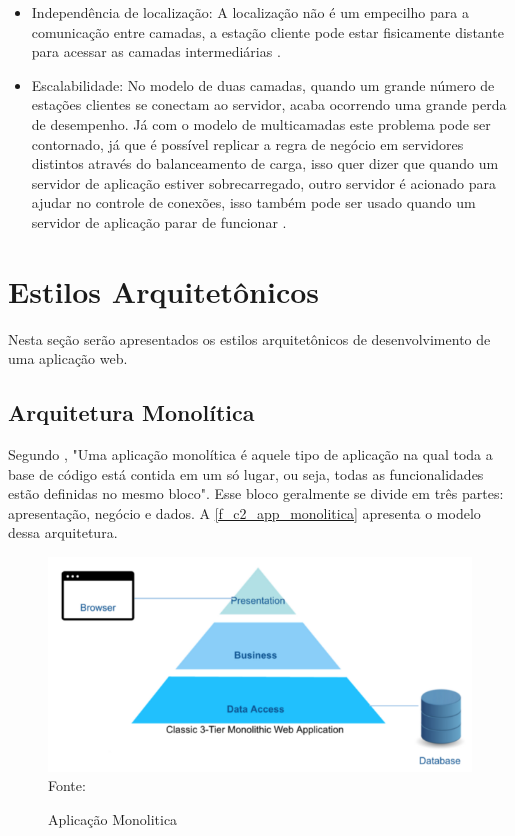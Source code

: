 \begin{itemize}
\item Independência de localização: A localização não é um empecilho para a comunicação entre camadas, a estação cliente pode estar fisicamente distante para acessar as camadas intermediárias  \cite{devmediaMultiCamada2018}.

\item Escalabilidade: No modelo de duas camadas, quando um grande número de estações clientes se conectam ao servidor, acaba ocorrendo uma grande perda de desempenho. Já com o modelo de multicamadas este problema pode ser contornado, já que é possível replicar a regra de negócio em servidores distintos através do balanceamento de carga, isso quer dizer que quando um servidor de aplicação estiver sobrecarregado, outro servidor é acionado para ajudar no controle de conexões, isso também pode ser usado quando um servidor de aplicação parar de funcionar \cite{devmediaMultiCamada2018}.
\end{itemize}

\section{Estilos Arquitetônicos}

Nesta seção serão apresentados os estilos arquitetônicos de desenvolvimento de uma aplicação web.

\subsection{Arquitetura Monolítica}

Segundo \cite{monoVsMicro2017},  "Uma aplicação monolítica é aquele tipo de aplicação na qual toda a base de código está contida em um só lugar, ou seja, todas as funcionalidades estão definidas no mesmo bloco". Esse bloco geralmente se divide em três partes: apresentação, negócio e dados. A \autoref{f_c2_app_monolitica} apresenta o modelo dessa arquitetura.

\begin{figure}[h]
	\centering
	\caption{Aplicação Monolitica}
	\includegraphics[scale=0.7]{images/app-monolitica.png}\\
	{\footnotesize Fonte:\cite{monoVsMicro2017}}
 	\label{f_c2_app_monolitica}
\end{figure}
\newpage


